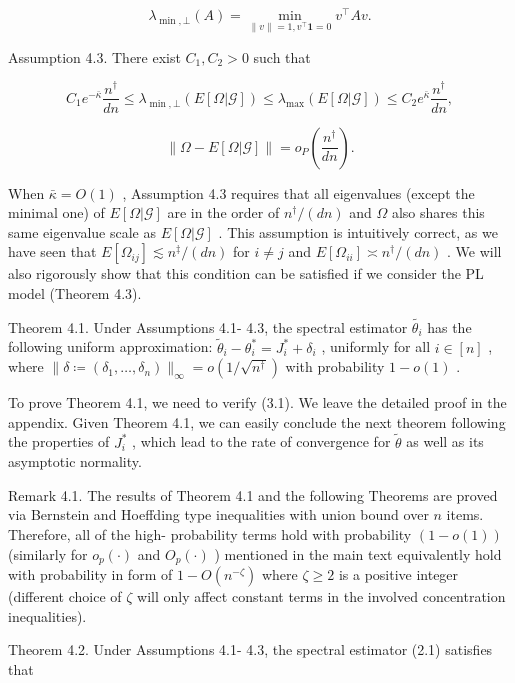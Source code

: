 \[
\lambda_{\min ,\bot}(A) = \min_{\| v\| = 1,v^{\top}\mathbf{1} = 0}v^{\top}A v.
\]

Assumption 4.3. There exist \(C_1,C_2 > 0\) such that

\[
C_1e^{-\bar{\kappa}}\frac{n^\dagger}{dn}\leq \lambda_{\min ,\bot}(E[\Omega |\mathcal{G}])\leq \lambda_{\max}(E[\Omega |\mathcal{G}])\leq C_2e^{\bar{\kappa}}\frac{n^\dagger}{dn}, \tag{4.1}
\]

\[
\| \Omega -E[\Omega |\mathcal{G}]\| = o_{P}\left(\frac{n^{\dagger}}{dn}\right). \tag{4.2}
\]

When \(\bar{\kappa} = O(1)\) , Assumption 4.3 requires that all
eigenvalues (except the minimal one) of \(E[\Omega |\mathcal{G}]\) are
in the order of \(n^{\dagger} / (dn)\) and \(\Omega\) also shares this
same eigenvalue scale as \(E[\Omega |\mathcal{G}]\) . This assumption is
intuitively correct, as we have seen that
\(E[\Omega_{ij}]\lesssim n^{\ddagger} / (dn)\) for \(i\neq j\) and
\(E[\Omega_{ii}]\asymp n^{\dagger} / (dn)\) . We will also rigorously
show that this condition can be satisfied if we consider the PL model
(Theorem 4.3).

Theorem 4.1. Under Assumptions 4.1- 4.3, the spectral estimator
\(\widetilde{\theta_{i}}\) has the following uniform approximation:
\(\widetilde{\theta}_{i} - \theta_{i}^{*} = J_{i}^{*} + \delta_{i}\) ,
uniformly for all \(i\in [n]\) , where
\(\| \delta \coloneqq (\delta_{1},\dots ,\delta_{n})\|_{\infty} = o(1 / \sqrt{n^{\dagger}})\)
with probability \(1 - o(1)\) .

To prove Theorem 4.1, we need to verify (3.1). We leave the detailed
proof in the appendix. Given Theorem 4.1, we can easily conclude the
next theorem following the properties of \(J_{i}^{*}\) , which lead to
the rate of convergence for \(\widetilde{\theta}\) as well as its
asymptotic normality.

Remark 4.1. The results of Theorem 4.1 and the following Theorems are
proved via Bernstein and Hoeffding type inequalities with union bound
over \(n\) items. Therefore, all of the high- probability terms hold
with probability \((1 - o(1))\) (similarly for \(o_{p}(\cdot)\) and
\(O_{p}(\cdot)\) ) mentioned in the main text equivalently hold with
probability in form of \(1 - O(n^{- \zeta})\) where \(\zeta \geq 2\) is
a positive integer (different choice of \(\zeta\) will only affect
constant terms in the involved concentration inequalities).

Theorem 4.2. Under Assumptions 4.1- 4.3, the spectral estimator (2.1)
satisfies that

